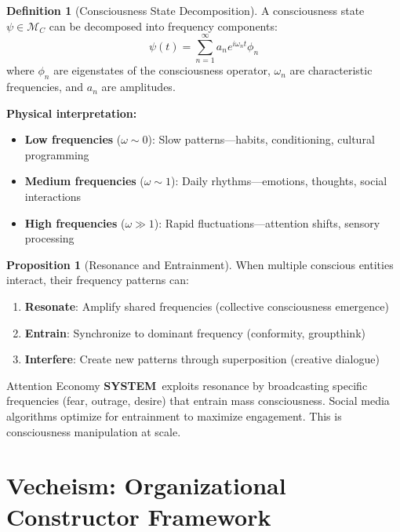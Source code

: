 \documentclass[11pt,a4paper]{article}
\newcommand{\SYSTEM}{\textbf{SYSTEM}}
\theoremstyle{definition}
\newtheorem{definition}{Definition}[section]
\newtheorem{proposition}{Proposition}[section]
\theoremstyle{remark}
\begin{document}
\begin{definition}[Consciousness State Decomposition]
A consciousness state $\psi \in \mathcal{M}_C$ can be decomposed into frequency components:
\[
\psi(t) = \sum_{n=1}^{\infty} a_n e^{i\omega_n t} \phi_n
\]
where $\phi_n$ are eigenstates of the consciousness operator, $\omega_n$ are characteristic frequencies, and $a_n$ are amplitudes.
\end{definition}

\textbf{Physical interpretation:}
\begin{itemize}[leftmargin=1.5em]
    \item \textbf{Low frequencies} ($\omega \sim 0$): Slow patterns---habits, conditioning, cultural programming
    \item \textbf{Medium frequencies} ($\omega \sim 1$): Daily rhythms---emotions, thoughts, social interactions
    \item \textbf{High frequencies} ($\omega \gg 1$): Rapid fluctuations---attention shifts, sensory processing
\end{itemize}

\begin{proposition}[Resonance and Entrainment]
When multiple conscious entities interact, their frequency patterns can:
\begin{enumerate}[leftmargin=1.5em]
    \item \textbf{Resonate}: Amplify shared frequencies (collective consciousness emergence)
    \item \textbf{Entrain}: Synchronize to dominant frequency (conformity, groupthink)
    \item \textbf{Interfere}: Create new patterns through superposition (creative dialogue)
\end{enumerate}
\end{proposition}

\begin{systemwarning}{Attention Economy}
\SYSTEM\ exploits resonance by broadcasting specific frequencies (fear, outrage, desire) that entrain mass consciousness. Social media algorithms optimize for entrainment to maximize engagement. This is consciousness manipulation at scale.
\end{systemwarning}

\section{Vecheism: Organizational Constructor Framework}
\label{app:vecheism}
\end{document}
